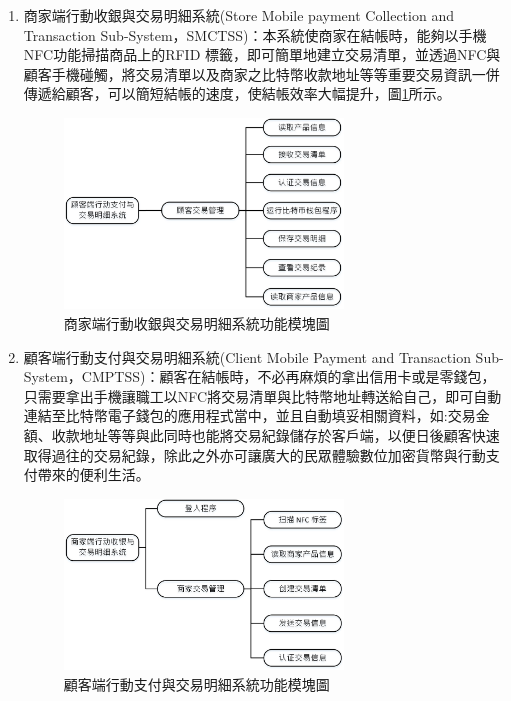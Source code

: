 \begin{enumerate}
		\item 商家端行動收銀與交易明細系統(Store Mobile payment Collection and Transaction Sub-System，SMCTSS)：本系統使商家在結帳時，能夠以手機NFC功能掃描商品上的RFID 標籤，即可簡單地建立交易清單，並透過NFC與顧客手機碰觸，將交易清單以及商家之比特幣收款地址等等重要交易資訊一併傳遞給顧客，可以簡短結帳的速度，使結帳效率大幅提升，圖\ref{model2}所示。
		 
			\begin{figure}[htbp]
			\centering
			\includegraphics[width = 0.7\textwidth]{model2.jpg}
			\caption{商家端行動收銀與交易明細系統功能模塊圖}\label{model2}
			\end{figure}


		\item 顧客端行動支付與交易明細系統(Client Mobile Payment and Transaction Sub-System，CMPTSS)：顧客在結帳時，不必再麻煩的拿出信用卡或是零錢包，只需要拿出手機讓職工以NFC將交易清單與比特幣地址轉送給自己，即可自動連結至比特幣電子錢包的應用程式當中，並且自動填妥相關資料，如:交易金額、收款地址等等與此同時也能將交易紀錄儲存於客戶端，以便日後顧客快速取得過往的交易紀錄，除此之外亦可讓廣大的民眾體驗數位加密貨幣與行動支付帶來的便利生活。
			\begin{figure}[htbp]
			\centering
			\includegraphics[width = 0.7\textwidth]{model3.jpg}
			\caption{顧客端行動支付與交易明細系統功能模塊圖}\label{model3}
			\end{figure}
		
	\end{enumerate}


